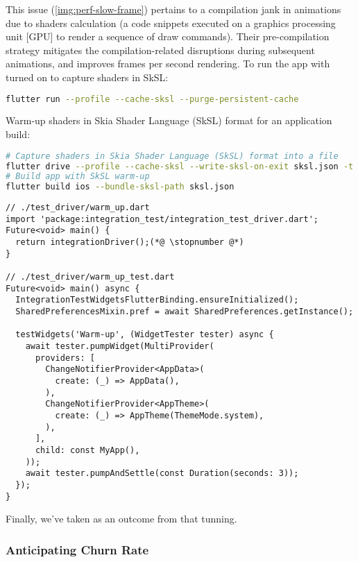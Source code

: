 
\noindent This issue (\cref{img:perf-slow-frame}) pertains to a compilation jank in animations due to shaders 
calculation (a code snippets executed on a graphics processing unit [GPU] to render a sequence of draw commands). 
Their pre-compilation strategy mitigates the compilation-related disruptions during subsequent animations, and improves 
frames per second rendering. To run the app with  turned on to capture shaders in SkSL:

\begin{lstlisting}[language=bash]
flutter run --profile --cache-sksl --purge-persistent-cache
\end{lstlisting}

\noindent Warm-up shaders in Skia Shader Language (SkSL) format for an application build:

\begin{lstlisting}[language=bash]
# Capture shaders in Skia Shader Language (SkSL) format into a file
flutter drive --profile --cache-sksl --write-sksl-on-exit sksl.json -t test_driver/warm_up.dart
# Build app with SkSL warm-up
flutter build ios --bundle-sksl-path sksl.json
\end{lstlisting}

\begin{lstlisting}
// ./test_driver/warm_up.dart
import 'package:integration_test/integration_test_driver.dart';
Future<void> main() {
  return integrationDriver();(*@ \stopnumber @*)
}

// ./test_driver/warm_up_test.dart
Future<void> main() async {
  IntegrationTestWidgetsFlutterBinding.ensureInitialized();
  SharedPreferencesMixin.pref = await SharedPreferences.getInstance();

  testWidgets('Warm-up', (WidgetTester tester) async {
    await tester.pumpWidget(MultiProvider(
      providers: [
        ChangeNotifierProvider<AppData>(
          create: (_) => AppData(),
        ),
        ChangeNotifierProvider<AppTheme>(
          create: (_) => AppTheme(ThemeMode.system),
        ),
      ],
      child: const MyApp(),
    ));
    await tester.pumpAndSettle(const Duration(seconds: 3));
  });
}
\end{lstlisting}

\noindent Finally, we've taken  as an outcome from that tunning.

\subsubsection{Anticipating Churn Rate}
